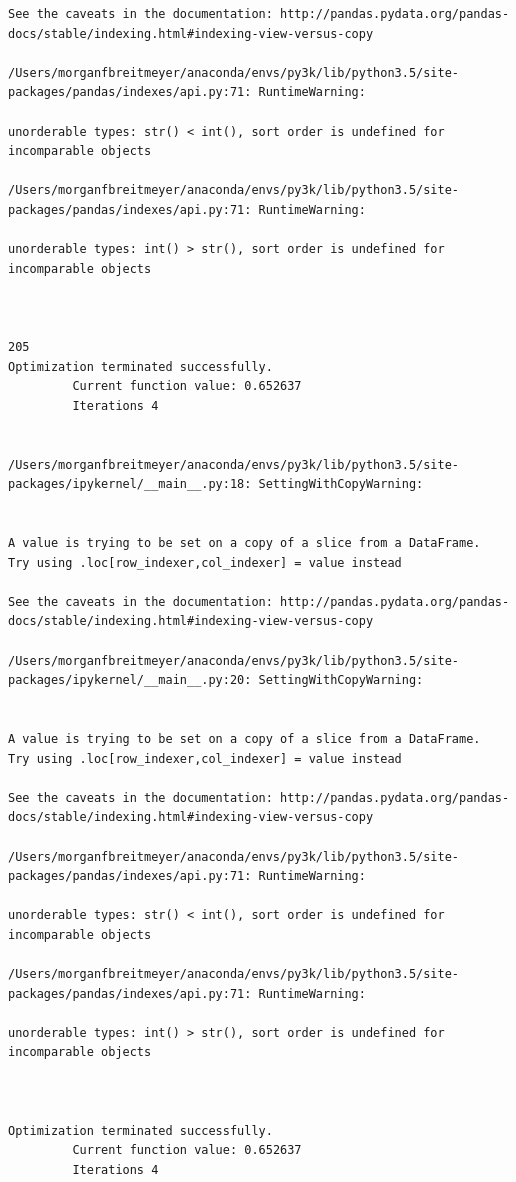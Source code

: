 \begin{lstlisting}
See the caveats in the documentation: http://pandas.pydata.org/pandas-docs/stable/indexing.html#indexing-view-versus-copy

/Users/morganfbreitmeyer/anaconda/envs/py3k/lib/python3.5/site-packages/pandas/indexes/api.py:71: RuntimeWarning:

unorderable types: str() < int(), sort order is undefined for incomparable objects

/Users/morganfbreitmeyer/anaconda/envs/py3k/lib/python3.5/site-packages/pandas/indexes/api.py:71: RuntimeWarning:

unorderable types: int() > str(), sort order is undefined for incomparable objects



205
Optimization terminated successfully.
         Current function value: 0.652637
         Iterations 4


/Users/morganfbreitmeyer/anaconda/envs/py3k/lib/python3.5/site-packages/ipykernel/__main__.py:18: SettingWithCopyWarning:


A value is trying to be set on a copy of a slice from a DataFrame.
Try using .loc[row_indexer,col_indexer] = value instead

See the caveats in the documentation: http://pandas.pydata.org/pandas-docs/stable/indexing.html#indexing-view-versus-copy

/Users/morganfbreitmeyer/anaconda/envs/py3k/lib/python3.5/site-packages/ipykernel/__main__.py:20: SettingWithCopyWarning:


A value is trying to be set on a copy of a slice from a DataFrame.
Try using .loc[row_indexer,col_indexer] = value instead

See the caveats in the documentation: http://pandas.pydata.org/pandas-docs/stable/indexing.html#indexing-view-versus-copy

/Users/morganfbreitmeyer/anaconda/envs/py3k/lib/python3.5/site-packages/pandas/indexes/api.py:71: RuntimeWarning:

unorderable types: str() < int(), sort order is undefined for incomparable objects

/Users/morganfbreitmeyer/anaconda/envs/py3k/lib/python3.5/site-packages/pandas/indexes/api.py:71: RuntimeWarning:

unorderable types: int() > str(), sort order is undefined for incomparable objects



Optimization terminated successfully.
         Current function value: 0.652637
         Iterations 4



\end{lstlisting}
